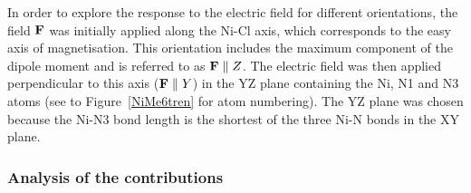 \documentclass[12pt,a4paper]{report}
\numberwithin{equation}{section}
\begin{document}
In order to explore the response to the electric field for different orientations, the field $\vb{F}$ was initially applied along the Ni-Cl axis, which corresponds to the easy axis of magnetisation.
This orientation includes the maximum component of the dipole moment and is referred to as $\vb{F}\parallel Z$.
The electric field was then applied perpendicular to this axis ($\vb{F}\parallel Y$) in the YZ plane containing the Ni, N1 and N3 atoms (see to Figure~\ref{NiMe6tren} for atom numbering). 
The YZ plane was chosen because the Ni-N3 bond length is the shortest of the three Ni-N bonds in the XY plane.

\subsubsection*{Analysis of the contributions}
\end{document}
